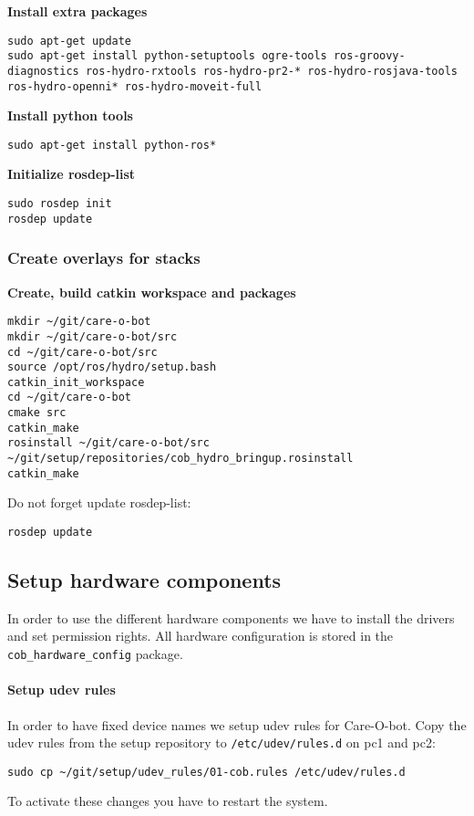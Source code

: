 \textbf{Install extra packages}
\begin{lstlisting}
sudo apt-get update
sudo apt-get install python-setuptools ogre-tools ros-groovy-diagnostics ros-hydro-rxtools ros-hydro-pr2-* ros-hydro-rosjava-tools ros-hydro-openni* ros-hydro-moveit-full
\end{lstlisting}

\textbf{Install python tools}
\begin{lstlisting}
sudo apt-get install python-ros*
\end{lstlisting}

\textbf{Initialize rosdep-list}
\begin{lstlisting}
sudo rosdep init
rosdep update
\end{lstlisting}

\subsubsection{Create overlays for stacks}
\textbf{Create, build catkin workspace and packages}
\begin{lstlisting}
mkdir ~/git/care-o-bot
mkdir ~/git/care-o-bot/src
cd ~/git/care-o-bot/src
source /opt/ros/hydro/setup.bash
catkin_init_workspace
cd ~/git/care-o-bot
cmake src
catkin_make
rosinstall ~/git/care-o-bot/src ~/git/setup/repositories/cob_hydro_bringup.rosinstall
catkin_make
\end{lstlisting}

Do not forget update rosdep-list: 
\begin{lstlisting}
rosdep update
\end{lstlisting}

\subsection{Setup hardware components}
In order to use the different hardware components we have to install the drivers and set permission rights. All hardware configuration is stored in the \texttt{cob\_hardware\_config} package.

\paragraph{Setup udev rules}
In order to have fixed device names we setup udev rules for Care-O-bot. Copy the udev rules from the setup repository to \texttt{/etc/udev/rules.d} on pc1 and pc2:
\begin{lstlisting}
sudo cp ~/git/setup/udev_rules/01-cob.rules /etc/udev/rules.d
\end{lstlisting}
To activate these changes you have to restart the system.

